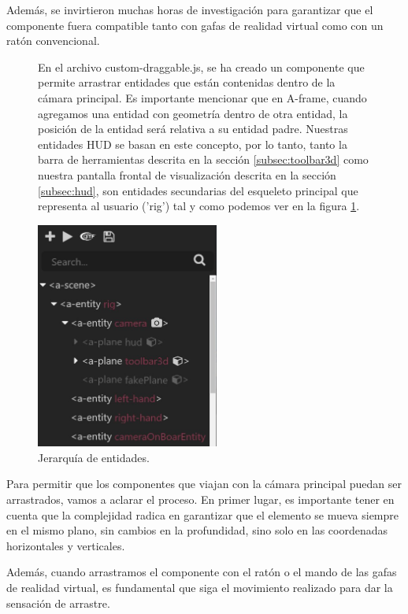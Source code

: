 \documentclass[a4paper, 11pt]{book}
\begin{document}
Además, se invirtieron muchas horas de investigación para garantizar que el componente fuera compatible tanto con gafas de realidad virtual como con un ratón convencional.
\begin{figure}[h]
  \begin{minipage}[b]{0.58\linewidth}
    En el archivo custom-draggable.js, se ha creado un componente que permite arrastrar entidades que están contenidas dentro de la cámara principal. Es importante mencionar que en A-frame, cuando agregamos una entidad con geometría dentro de otra entidad, la posición de la entidad será relativa a su entidad padre. Nuestras entidades HUD se basan en este concepto, por lo tanto, tanto la barra de herramientas descrita en la sección \ref{subsec:toolbar3d} como nuestra pantalla frontal de visualización descrita en la sección \ref{subsec:hud}, son entidades secundarias del esqueleto principal que representa al usuario ('rig') tal y como podemos ver en la figura \ref{fig:jerarquiaEntidadesRig}.
  \end{minipage}%
  \hfill
  \begin{minipage}[b]{0.4\linewidth}
    \centering
    \includegraphics[width=6cm, keepaspectratio]{img/jerarquiaRig.jpg}
    \caption{Jerarquía de entidades.}
    \label{fig:jerarquiaEntidadesRig}    
  \end{minipage}
\end{figure}

Para permitir que los componentes que viajan con la cámara principal puedan ser arrastrados, vamos a aclarar el proceso. En primer lugar, es importante tener en cuenta que la complejidad radica en garantizar que el elemento se mueva siempre en el mismo plano, sin cambios en la profundidad, sino solo en las coordenadas horizontales y verticales.

Además, cuando arrastramos el componente con el ratón o el mando de las gafas de realidad virtual, es fundamental que siga el movimiento realizado para dar la sensación de arrastre.
\end{document}
